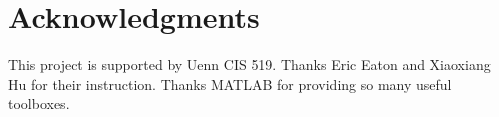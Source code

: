 \documentclass{article}
\begin{document}



\section*{Acknowledgments} 
This project is supported by Uenn CIS 519. Thanks Eric Eaton and Xiaoxiang Hu for their instruction. Thanks MATLAB for providing so many useful toolboxes.



\end{document}
